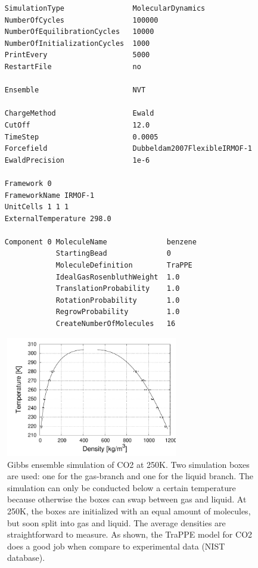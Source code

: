 \begin{tiny}
\begin{verbatim}
     SimulationType                MolecularDynamics
     NumberOfCycles                100000
     NumberOfEquilibrationCycles   10000
     NumberOfInitializationCycles  1000
     PrintEvery                    5000
     RestartFile                   no
     
     Ensemble                      NVT
     
     ChargeMethod                  Ewald
     CutOff                        12.0
     TimeStep                      0.0005
     Forcefield                    Dubbeldam2007FlexibleIRMOF-1
     EwaldPrecision                1e-6
     
     Framework 0
     FrameworkName IRMOF-1
     UnitCells 1 1 1
     ExternalTemperature 298.0
     
     Component 0 MoleculeName              benzene
                 StartingBead              0
                 MoleculeDefinition        TraPPE
                 IdealGasRosenbluthWeight  1.0
                 TranslationProbability    1.0
                 RotationProbability       1.0
                 RegrowProbability         1.0
                 CreateNumberOfMolecules   16
\end{verbatim}
\end{tiny}

\begin{figure}[t]
  \centering
  \includegraphics[width=7.5cm]{./Examples/GibbsCO2.pdf}
  \caption{Gibbs ensemble simulation of CO2 at 250K. Two simulation boxes are used: one for the gas-branch and one for the liquid branch. The simulation can
           only be conducted below a certain temperature because otherwise the boxes can swap between gas and liquid. At 250K, the boxes are initialized
           with an equal amount of molecules, but soon split into gas and liquid. The average densities are straightforward to measure. As shown, the
           TraPPE model for CO2 does a good job when compare to experimental data (NIST database).}
  \label{Fig: Gibbs CO2}
\end{figure}

